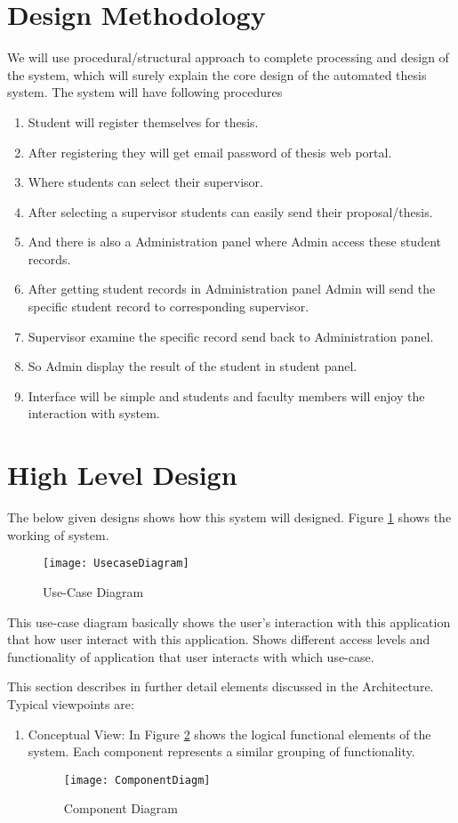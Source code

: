 \section{Design Methodology}
We will use procedural/structural approach to complete processing and design of the system, which will surely explain the core design of the automated thesis system.
The system will have following procedures
\begin{enumerate}
\item Student will register themselves for thesis.
\item After registering they will get email password of thesis web portal.
\item Where students can select their supervisor.
\item After selecting a supervisor students can easily send their proposal/thesis. 
\item And there is also a Administration panel where Admin access these student records.
\item After getting student records in Administration panel Admin will send the specific student record to corresponding supervisor.
\item Supervisor examine the specific record send back to Administration panel.
\item So Admin display the result of the student in student panel.
\item Interface will be simple and students and faculty members will enjoy the interaction with system.
\end{enumerate}  


\section{High Level Design}

The below given designs shows how this system will designed.
Figure \ref{fig:UsecaseDiagram} shows the working of system. 
	\begin{figure}[ht]
\centering
\texttt{[image: UsecaseDiagram]}
\caption{Use-Case Diagram}
\label{fig:UsecaseDiagram}
\end{figure}
\par This use-case diagram basically shows the user's interaction with this application that how user interact with this application. Shows different access levels and functionality of application that user interacts with which use-case.

\par This section describes in further detail elements discussed in the Architecture. Typical viewpoints are: 
\begin{enumerate}
	\item   Conceptual View: In Figure \ref{fig:ComponentDiagm} shows the logical functional elements of the system.  Each component represents a similar grouping of functionality.
	\begin{figure}[ht]
\centering
\texttt{[image: ComponentDiagm]}
\caption{Component Diagram}
\label{fig:ComponentDiagm}
\end{figure}

\end{enumerate}
\enlargethispage{-\baselineskip}
